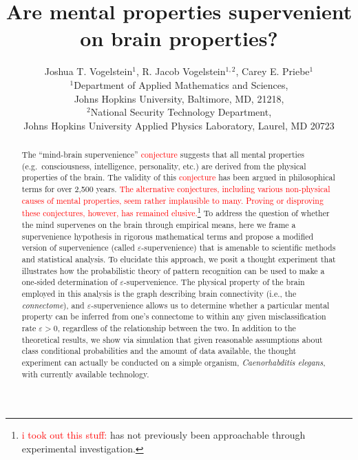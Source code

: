 \documentclass{article}
\title{Are mental properties supervenient on brain properties?}
\author{Joshua T. Vogelstein$^1$, R. Jacob Vogelstein$^{1,2}$, Carey E. Priebe$^1$\\
$^1$Department of Applied Mathematics and Sciences, \\ Johns Hopkins University, Baltimore, MD, 21218,\\ $^2$National Security Technology Department, \\ Johns Hopkins University Applied Physics Laboratory, Laurel, MD 20723}
\providecommand{\tr}[1]{\textcolor{red}{#1}}
\begin{document}
\maketitle
\begin{abstract}


The ``mind-brain supervenience'' \tr{conjecture} suggests that all mental properties (e.g.\ consciousness, intelligence, personality, etc.) are derived from the physical properties of the brain. The validity of this \tr{conjecture} has been argued in philosophical terms for over 2,500 years. \tr{The alternative conjectures, including various non-physical causes of mental properties, seem rather implausible to many.  Proving or disproving these conjectures, however, has remained elusive.}\footnote{\tr{i took out this stuff:} has not previously been approachable through experimental investigation.} To address the question of whether the mind supervenes on the brain through empirical means, here we frame a supervenience hypothesis in rigorous mathematical terms and propose a modified version of supervenience (called $\varepsilon$-supervenience) that is amenable to scientific methods and statistical analysis. To elucidate this approach, we posit a thought experiment that illustrates how the probabilistic theory of pattern recognition can be used to make a one-sided determination of $\varepsilon$-supervenience. The physical property of the brain employed in this analysis is the graph describing brain connectivity (i.e., the \emph{connectome}), and $\varepsilon$-supervenience allows us to determine whether a particular mental property can be inferred from one's connectome to within any given misclassification rate $\varepsilon > 0$, regardless of the relationship between the two. In addition to the theoretical results, we show via simulation that given reasonable assumptions about class conditional probabilities and the amount of data available, the thought experiment can actually be conducted on a simple organism, \emph{Caenorhabditis elegans}, with currently available technology.

\end{abstract}

\vspace*{0.5 in}
\end{document}
